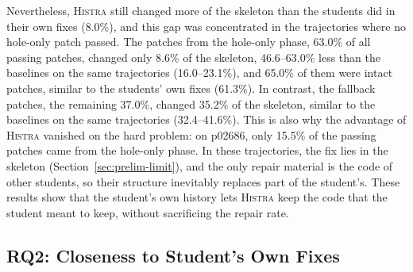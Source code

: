 \documentclass[10pt,conference]{IEEEtran}
\begin{document}
Nevertheless, \textsc{Histra} still changed more of the skeleton than the students did in their own fixes (8.0\%), and this gap was concentrated in the trajectories where no hole-only patch passed. The patches from the hole-only phase, 63.0\% of all passing patches, changed only 8.6\% of the skeleton, 46.6--63.0\% less than the baselines on the same trajectories (16.0--23.1\%), and 65.0\% of them were intact patches, similar to the students' own fixes (61.3\%). In contrast, the fallback patches, the remaining 37.0\%, changed 35.2\% of the skeleton, similar to the baselines on the same trajectories (32.4--41.6\%). This is also why the advantage of \textsc{Histra} vanished on the hard problem: on p02686, only 15.5\% of the passing patches came from the hole-only phase. In these trajectories, the fix lies in the skeleton (Section~\ref{sec:prelim-limit}), and the only repair material is the code of other students, so their structure inevitably replaces part of the student's. These results show that the student's own history lets \textsc{Histra} keep the code that the student meant to keep, without sacrificing the repair rate.

\subsection{RQ2: Closeness to Student's Own Fixes}\label{sec:rq-close}
\end{document}
